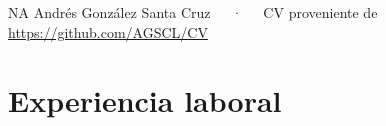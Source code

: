 \documentclass[11pt,a4paper,]{awesome-cv}
\begin{document}
\makecvheader

\makecvfooter
  {NA}
    {Andrés González Santa Cruz~~~·~~~CV proveniente de
\href{hhttps://github.com/AGSCL/CV}{https://github.com/AGSCL/CV}}
  {\thepage}





\section{Experiencia laboral}\label{experiencia-laboral}
\end{document}

